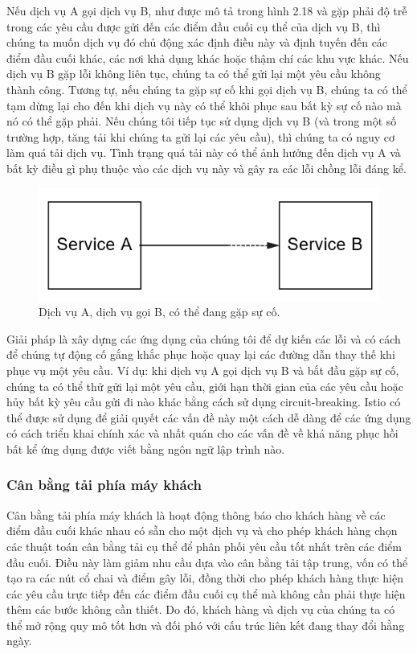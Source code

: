 \documentclass[12pt,a4paper]{report}
\begin{document}
Nếu dịch vụ A gọi dịch vụ B, như được mô tả trong hình 2.18 và gặp phải độ trễ trong các yêu cầu được gửi đến các điểm đầu cuối cụ thể của dịch vụ B, thì chúng ta muốn dịch vụ đó chủ động xác định điều này và định tuyến đến các điểm đầu cuối khác, các nơi khả dụng khác hoặc thậm chí các khu vực khác. Nếu dịch vụ B gặp lỗi không liên tục, chúng ta có thể gửi lại một yêu cầu không thành công. Tương tự, nếu chúng ta gặp sự cố khi gọi dịch vụ B, chúng ta có thể tạm dừng lại cho đến khi dịch vụ này có thể khôi phục sau bất kỳ sự cố nào mà nó có thể gặp phải. Nếu chúng tôi tiếp tục sử dụng dịch vụ B (và trong một số trường hợp, tăng tải khi chúng ta gửi lại các yêu cầu), thì chúng ta có nguy cơ làm quá tải dịch vụ. Tình trạng quá tải này có thể ảnh hưởng đến dịch vụ A và bất kỳ điều gì phụ thuộc vào các dịch vụ này và gây ra các lỗi chồng lỗi đáng kể.
\begin{figure}[h]
	\centering
	\includegraphics[width=0.7\linewidth]{Pics/2.2.3-p1}
	\caption{Dịch vụ A, dịch vụ gọi B, có thể đang gặp sự cố.}
	\label{fig:2.2.3-1}
\end{figure}

Giải pháp là xây dựng các ứng dụng của chúng tôi để dự kiến các lỗi và có cách để chúng tự động cố gắng khắc phục hoặc quay lại các đường dẫn thay thế khi phục vụ một yêu cầu. Ví dụ: khi dịch vụ A gọi dịch vụ B và bắt đầu gặp sự cố, chúng ta có thể thử gửi lại một yêu cầu, giới hạn thời gian của các yêu cầu hoặc hủy bất kỳ yêu cầu gửi đi nào khác bằng cách sử dụng circuit-breaking. Istio có thể được sử dụng để giải quyết các vấn đề này một cách dễ dàng để các ứng dụng có cách triển khai chính xác và nhất quán cho các vấn đề về khả năng phục hồi bất kể ứng dụng được viết bằng ngôn ngữ lập trình nào.

			\subsubsection{Cân bằng tải phía máy khách}
\hspace{0.6cm}Cân bằng tải phía máy khách là hoạt động thông báo cho khách hàng về các điểm đầu cuối khác nhau có sẵn cho một dịch vụ và cho phép khách hàng chọn các thuật toán cân bằng tải cụ thể để phân phối yêu cầu tốt nhất trên các điểm đầu cuối. Điều này làm giảm nhu cầu dựa vào cân bằng tải tập trung, vốn có thể tạo ra các nút cổ chai và điểm gây lỗi, đồng thời cho phép khách hàng thực hiện các yêu cầu trực tiếp đến các điểm đầu cuối cụ thể mà không cần phải thực hiện thêm các bước không cần thiết. Do đó, khách hàng và dịch vụ của chúng ta có thể mở rộng quy mô tốt hơn và đối phó với cấu trúc liên kết đang thay đổi hằng ngày.
\end{document}
